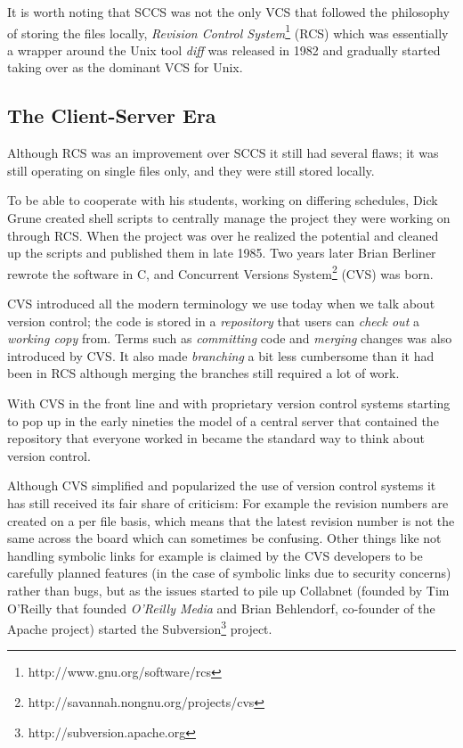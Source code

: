 \documentclass{llncs}
\begin{document}
It is worth noting that SCCS was not the only VCS that followed the
philosophy of storing the files locally, \emph{Revision Control
  System}\footnote{http://www.gnu.org/software/rcs} (RCS) which was
essentially a wrapper around the Unix tool \emph{diff} was released in
1982 and gradually started taking over as the dominant VCS for
Unix\cite{tichy85}.

\subsection{The Client-Server Era}
Although RCS was an improvement over SCCS it still had several flaws;
it was still operating on single files only, and they were still
stored locally. 

To be able to cooperate with his students, working on differing
schedules, Dick Grune created shell scripts to centrally manage the
project they were working on through RCS\cite{grune86}. When the
project was over he realized the potential and cleaned up the scripts
and published them in late 1985. Two years later Brian Berliner
rewrote the software in C, and Concurrent Versions System\footnote{
  http://savannah.nongnu.org/projects/cvs} (CVS) was born.

CVS introduced all the modern terminology we use today when we talk
about version control\cite{cederqvist93}; the code is stored in a
\emph{repository} that users can \emph{check out} a \emph{working
  copy} from. Terms such as \emph{committing} code and \emph{merging}
changes was also introduced by CVS. It also made \emph{branching} a
bit less cumbersome than it had been in RCS although merging the
branches still required a lot of work.

With CVS in the front line and with proprietary version control
systems starting to pop up in the early nineties the model of a
central server that contained the repository that everyone worked in
became the standard way to think about version control.

Although CVS simplified and popularized the use of version control
systems it has still received its fair share of
criticism\cite{robert06}\cite{subversion}: For example the revision
numbers are created on a per file basis, which means that the latest
revision number is not the same across the board which can sometimes
be confusing. Other things like not handling symbolic links for
example is claimed by the CVS developers to be carefully planned
features (in the case of symbolic links due to security concerns)
rather than bugs, but as the issues started to pile up Collabnet
(founded by Tim O'Reilly that founded \emph{O'Reilly Media} and Brian
Behlendorf, co-founder of the Apache project) started the
Subversion\footnote{http://subversion.apache.org} project.
\end{document}
